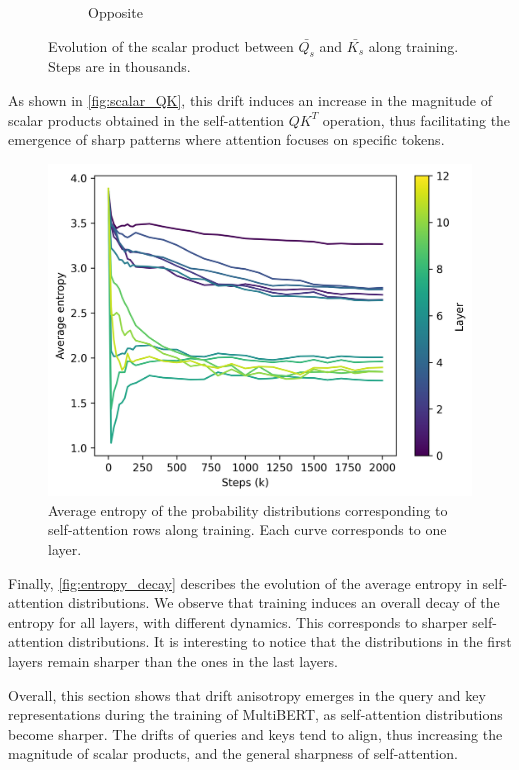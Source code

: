 \begin{figure}[ht]
\begin{subfigure}[b]{0.48\columnwidth}
         \caption{Opposite}
         \label{fig:scalar_opp}
    \end{subfigure}
    \caption{Evolution of the scalar product between $\bar{Q_s}$ and $\bar{K_s}$ along training. Steps are in thousands.}
    \label{fig:scalar_QK}
\end{figure}

As shown in \autoref{fig:scalar_QK}, this drift induces an increase in the magnitude of scalar products obtained in the self-attention $QK^T$ operation, thus facilitating the emergence of sharp patterns where attention focuses on specific tokens.

\begin{figure}[ht]
    \centering
    \includegraphics[width=0.8\linewidth]{sources/part_1/anisotropy/imgs/entropy_decay.png}
    \caption{Average entropy of the probability distributions corresponding to self-attention rows along training. Each curve corresponds to one layer.}
    \label{fig:entropy_decay}
\end{figure}

Finally, \autoref{fig:entropy_decay} describes the evolution of the average entropy in self-attention distributions. We observe that training induces an overall decay of the entropy for all layers, with different dynamics. This corresponds to sharper self-attention distributions. It is interesting to notice that the distributions in the first layers remain sharper than the ones in the last layers.

Overall, this section shows that drift anisotropy emerges in the query and key representations during the training of MultiBERT, as self-attention distributions become sharper. The drifts of queries and keys tend to align, thus increasing the magnitude of scalar products, and the general sharpness of self-attention.

